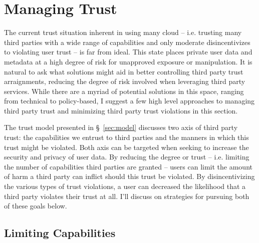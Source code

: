 \section{Managing Trust}
\label{sec:mitigation}

The current trust situation inherent in using many cloud --
i.e. trusting many third parties with a wide range of capabilities and
only moderate disincentivizes to violating user trust -- is far from
ideal. This state places private user data and metadata at a high
degree of risk for unapproved exposure or manipulation. It is natural
to ask what solutions might aid in better controlling third party
trust arraignments, reducing the degree of risk involved when
leveraging third party services. While there are a myriad of potential
solutions in this space, ranging from technical to policy-based, I
suggest a few high level approaches to managing third party trust and
minimizing third party trust violations in this section.

The trust model presented in \S~\ref{sec:model} discusses two axis of
third party trust: the capabilities we entrust to third parties and
the manners in which this trust might be violated. Both axis can be
targeted when seeking to increase the security and privacy of user
data. By reducing the degree or trust -- i.e. limiting the number of
capabilities third parties are granted -- users can limit the amount
of harm a third party can inflict should this trust be violated. By
disincentivizing the various types of trust violations, a user can
decreased the likelihood that a third party violates their trust at
all. I'll discuss on strategies for pursuing both of these goals
below.

\subsection{Limiting Capabilities}
\label{sec:mitigation:capabilites}


